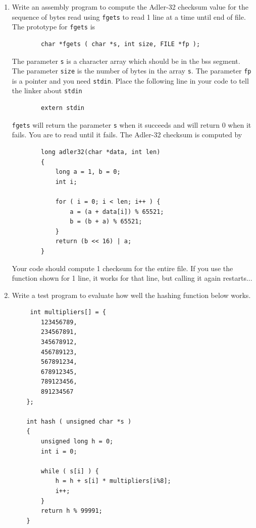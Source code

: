 \documentclass[11pt,b5paper]{book}
\begin{document}
\begin{enumerate}
    \item Write an assembly program to compute the Adler-32 checksum value for the sequence of bytes
    read using {\tt fgets} to read 1 line at a time until end of file.
    The prototype for {\tt fgets} is
    \begin{verbatim}
        char *fgets ( char *s, int size, FILE *fp );
    \end{verbatim}
    The parameter {\tt s} is a character array which should be in the bss segment.
    The parameter {\tt size} is the number of bytes in the array {\tt s}.
    The parameter {\tt fp} is a pointer and you need {\tt stdin}.
    Place the following line in your code to tell the linker about {\tt stdin}
    \begin{verbatim}
        extern stdin
    \end{verbatim}
    {\tt fgets} will return the parameter {\tt s} when it succeeds and will return 0 when it fails. 
    You are to read until it fails.
    The Adler-32 checksum is computed by 
    \begin{verbatim}
        long adler32(char *data, int len)
        {
            long a = 1, b = 0;
            int i;
 
            for ( i = 0; i < len; i++ ) {
                a = (a + data[i]) % 65521;
                b = (b + a) % 65521;
            }
            return (b << 16) | a;
        } 
    \end{verbatim}
    Your code should compute 1 checksum for the entire file.  If you use the function shown for 1 line, it
    works for that line, but calling it again restarts...

    \item Write a test program to evaluate how well the hashing function below works.
    \begin{verbatim}
     int multipliers[] = {
        123456789,
        234567891,
        345678912,
        456789123,
        567891234,
        678912345,
        789123456,
        891234567
    };

    int hash ( unsigned char *s )
    {
        unsigned long h = 0;
        int i = 0;
        
        while ( s[i] ) {
            h = h + s[i] * multipliers[i%8];
            i++;
        }
        return h % 99991;
    }
    \end{verbatim}


\end{enumerate}
\end{document}
